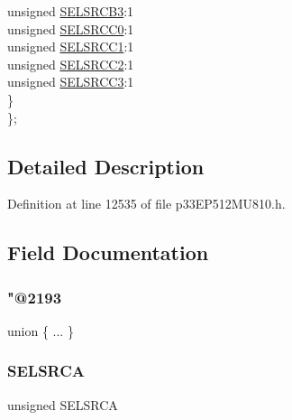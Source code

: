 \begin{DoxyCompactItemize}
\begin{tabbing}
\>\>unsigned \hyperlink{structtag_c_m3_m_s_k_s_r_c_b_i_t_s_add54534d44de4b82fdc84f84aa070f45}{SELSRCB3}:1\\
\>\>unsigned \hyperlink{structtag_c_m3_m_s_k_s_r_c_b_i_t_s_a695ed39b349ba556d685ef7fc3ab9f19}{SELSRCC0}:1\\
\>\>unsigned \hyperlink{structtag_c_m3_m_s_k_s_r_c_b_i_t_s_a5b873921176d73d0048f77a7230211c3}{SELSRCC1}:1\\
\>\>unsigned \hyperlink{structtag_c_m3_m_s_k_s_r_c_b_i_t_s_a7cf665e6530692c6a4905ad1e53934ad}{SELSRCC2}:1\\
\>\>unsigned \hyperlink{structtag_c_m3_m_s_k_s_r_c_b_i_t_s_a232ce18f72b62eef1f6ac40a0c4b7f31}{SELSRCC3}:1\\
\>\} \\
\}; \\

\end{tabbing}\end{DoxyCompactItemize}


\subsection{Detailed Description}


Definition at line 12535 of file p33\+E\+P512\+M\+U810.\+h.



\subsection{Field Documentation}
\mbox{\label{structtag_c_m3_m_s_k_s_r_c_b_i_t_s_a4aa56f23eb4c42ec5321506df9ba27cc}} 
\subsubsection{\texorpdfstring{"@2193}{@2193}}
{\footnotesize\ttfamily union \{ ... \} }

\mbox{\label{structtag_c_m3_m_s_k_s_r_c_b_i_t_s_a71efbbcc07c5589abbdc8fbc64bb43b7}} 
\subsubsection{\texorpdfstring{S\+E\+L\+S\+R\+CA}{SELSRCA}}
{\footnotesize\ttfamily unsigned S\+E\+L\+S\+R\+CA}



